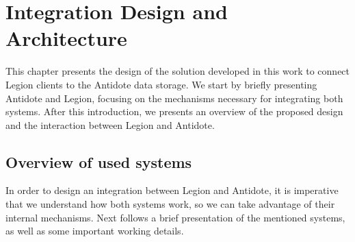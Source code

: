 \chapter{Integration Design and Architecture}
\label{cha:integration_design_and_architecture}

This chapter presents the design of the solution developed in this work to connect Legion clients to the Antidote data storage. We start by briefly presenting Antidote and Legion, focusing on the mechanisms necessary for integrating both systems. After this introduction, we presents an overview of the proposed design and the interaction between Legion and Antidote.

\section{Overview of used systems}
\label{sec:system_introduction}
In order to design an integration between Legion and Antidote, it is imperative that we understand how both systems work, so we can take advantage of their internal mechanisms. Next follows a brief presentation of the mentioned systems, as well as some important working details.

